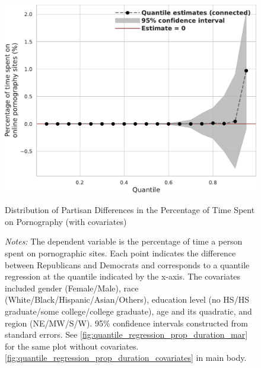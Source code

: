 \documentclass[12pt,twoside]{article}
\begin{document}
\begin{figure}[!ht]
	\centering
	\includegraphics[width=.7\linewidth]{figs/mar/quantile_reg_covariates_proportion_duration_adult.pdf}
	\caption{Distribution of Partisan Differences in the Percentage of Time Spent on Pornography (with covariates)}
	\caption*{\footnotesize \emph{Notes:} 
		The dependent variable is the percentage of time a person spent on pornographic sites.
		Each point indicates the difference between Republicans and Democrats and corresponds to a quantile regression at the quantile indicated by the x-axis.
		The covariates included gender (Female/Male), race (White/Black/Hispanic/Asian/Others), education level (no HS/HS graduate/some college/college graduate), age and its quadratic, and region (NE/MW/S/W).
		95\% confidence intervals constructed from standard errors.
		See \cref{fig:quantile_regression_prop_duration_mar} for the same plot without covariates.
            \cref{fig:quantile_regression_prop_duration_covariates} in main body.
	}
	\label{fig:quantile_regression_prop_duration_covariates_mar}
\end{figure}
\end{document}
